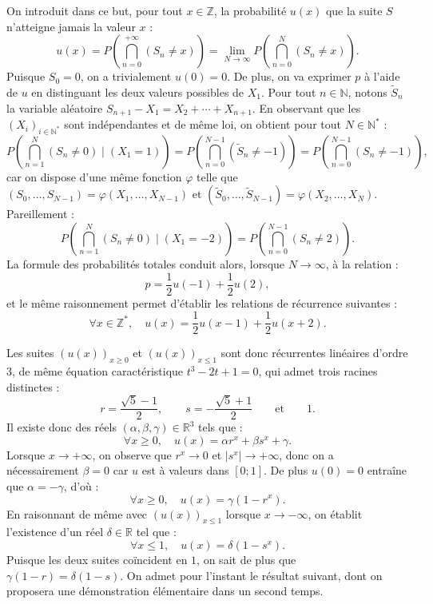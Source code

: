 On introduit dans ce but, pour tout $x \in \mathbb Z$, la probabilité $u(x)$ que la suite $S$ n'atteigne jamais la valeur $x$ :
\[
u(x) = P\left(\bigcap_{n=0}^{+\infty} (S_n \neq x)\right) = \lim_{N\to\infty} P\left(\bigcap_{n=0}^N (S_n \neq x)\right).
\]
Puisque $S_0=0$, on a trivialement $u(0) = 0$. De plus, on va exprimer $p$ à l'aide de $u$ en distinguant les deux valeurs possibles de $X_1$. Pour tout $n \in \mathbb N$, notons $\tilde S_n$ la variable aléatoire $S_{n+1} - X_1 = X_2 + \cdots + X_{n+1}$. En observant que les $(X_i)_{i\in\mathbb N^*}$ sont indépendantes et de même loi, on obtient pour tout $N \in \mathbb N^*$ :
\[
P\left(\bigcap_{n=1}^N (S_n \neq 0)\mid (X_1 = 1)\right) = P\left(\bigcap_{n=0}^{N-1} (\tilde S_n \neq -1)\right) = P\left(\bigcap_{n=0}^{N-1} (S_n \neq -1)\right),
\]
car on dispose d'une même fonction $\varphi$ telle que $(S_0,\dots,S_{N-1}) = \varphi(X_1,\dots,X_{N-1})$ et $(\tilde S_0,\dots,\tilde S_{N-1}) = \varphi(X_2,\dots,X_N)$. 
Pareillement :
\[
P\left(\bigcap_{n=1}^N (S_n \neq 0)\mid (X_1 = -2)\right) = P\left(\bigcap_{n=0}^{N-1} (S_n \neq 2)\right).
\]
La formule des probabilités totales conduit alors, lorsque $N \to \infty$, à la relation :
\[
p= \frac12 u(-1) + \frac12 u(2),
\]
et le même raisonnement permet d'établir les relations de récurrence suivantes :
\[
\forall x \in \mathbb Z^*,\quad
u(x) = \frac12 u(x-1) + \frac12 u(x+2).
\]

Les suites $(u(x))_{x \geqslant 0}$ et $(u(x))_{x \leqslant 1}$ sont donc récurrentes linéaires d'ordre $3$, de même équation caractéristique
$t^3 - 2t + 1 = 0$, qui admet trois racines distinctes :
\[
r = \frac{\sqrt 5 - 1}{2},
\qquad
s = - \frac{\sqrt 5 + 1}{2}
\qquad\text{et}\qquad
1.
\]
Il existe donc des réels $(\alpha,\beta,\gamma) \in \mathbb R^3$ tels que :
$$
\forall x\geqslant 0,\quad
u(x) = \alpha r^x + \beta s^x + \gamma.
$$
Lorsque $x \to +\infty$, on observe que $r^x \to 0$ et $|s^x| \to +\infty$, donc on a nécessairement $\beta= 0$ car $u$ est à valeurs dans $[0;1]$. De plus $u(0) = 0$ entraîne que $\alpha = -\gamma$, d'où :
$$
\forall x\geqslant 0,\quad
u(x) = \gamma(1 - r^x).
$$
En raisonnant de même avec $(u(x))_{x \leqslant 1}$ lorsque $x \to -\infty$, on établit l'existence d'un réel $\delta \in \mathbb R$ tel que :
$$
\forall x \leqslant 1,\quad
u(x) = \delta(1-s^x).
$$
Puisque les deux suites coïncident en $1$, on sait de plus que $\gamma(1-r) = \delta (1-s).$
On admet pour l'instant le résultat suivant, dont on proposera une démonstration élémentaire dans un second temps.

